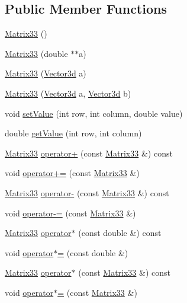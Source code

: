 \subsection*{\-Public \-Member \-Functions}
\begin{DoxyCompactItemize}
\item 
\hyperlink{classMatrix33_a70acb6647b172d017cc4265a29a7d263}{\-Matrix33} ()
\item 
\hyperlink{classMatrix33_a4399c6da8f1ac31ce514550282c823cf}{\-Matrix33} (double $\ast$$\ast$a)
\item 
\hyperlink{classMatrix33_a1f070a29a710043c38b56cee8214e6f7}{\-Matrix33} (\hyperlink{classVector3d}{\-Vector3d} a)
\item 
\hyperlink{classMatrix33_a7f1deae895c26e47c39c76bfaa31d3d2}{\-Matrix33} (\hyperlink{classVector3d}{\-Vector3d} a, \hyperlink{classVector3d}{\-Vector3d} b)
\item 
void \hyperlink{classMatrix33_a6cdcec77fd089b2e73ad7ae85ecff30b}{set\-Value} (int row, int column, double value)
\item 
double \hyperlink{classMatrix33_a849bbdf7b456ddacf7185b087fca4015}{get\-Value} (int row, int column)
\item 
\hyperlink{classMatrix33}{\-Matrix33} \hyperlink{classMatrix33_adc58ec5739c9250ff1150c725d0e868e}{operator+} (const \hyperlink{classMatrix33}{\-Matrix33} \&) const 
\item 
void \hyperlink{classMatrix33_acb59e59d3937e075521f478ba83b7165}{operator+=} (const \hyperlink{classMatrix33}{\-Matrix33} \&)
\item 
\hyperlink{classMatrix33}{\-Matrix33} \hyperlink{classMatrix33_a372f71ec208bb6d3045acd4324b7cb06}{operator-\/} (const \hyperlink{classMatrix33}{\-Matrix33} \&) const 
\item 
void \hyperlink{classMatrix33_abc889e10a9c7c532195c7031c1344a74}{operator-\/=} (const \hyperlink{classMatrix33}{\-Matrix33} \&)
\item 
\hyperlink{classMatrix33}{\-Matrix33} \hyperlink{classMatrix33_a6992fd2bb0b6e9ad71b5d3481c4e3e1a}{operator$\ast$} (const double \&) const 
\item 
void \hyperlink{classMatrix33_a83162791813bef030b1ceb5df3c5cae3}{operator$\ast$=} (const double \&)
\item 
\hyperlink{classMatrix33}{\-Matrix33} \hyperlink{classMatrix33_a525f14614255ff81c0cbab8060e8e065}{operator$\ast$} (const \hyperlink{classMatrix33}{\-Matrix33} \&) const 
\item 
void \hyperlink{classMatrix33_ac3937bdeb034cc83b4adcad16cd58a26}{operator$\ast$=} (const \hyperlink{classMatrix33}{\-Matrix33} \&)
$$
\end{DoxyCompactItemize}
